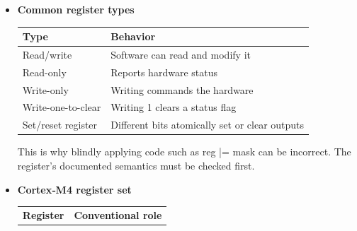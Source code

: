 \documentclass{report}
\begin{document}
\begin{itemize}
\begin{itemize}
                \item \textbf{Peripheral registers}: These are memory-mapped hardware control locations:
                    \begin{itemize}
                        \item GPIOA\_MODER
                        \item GPIOA\_IDR
                        \item GPIOA\_ODR
                        \item RCC\_AHB1ENR
                        \item TIM2\_CR1
                        \item USART2\_DR
                    \end{itemize}
                    They are sometimes called special-function registers, or SFRs.
            \end{itemize}
        \item \textbf{Common register types}
            \begin{center}
                \begin{tabularx}{\textwidth}{@{}XX@{}}
                    \toprule
                    \textbf{Type}&	\textbf{Behavior} \\
                    \midrule
                    Read/write	&Software can read and modify it\\[2ex]
                    Read-only	&Reports hardware status\\[2ex]
                    Write-only	&Writing commands the hardware\\[2ex]
                    Write-one-to-clear	&Writing 1 clears a status flag\\[2ex]
                    Set/reset register	&Different bits atomically set or clear outputs \\
                    \bottomrule
                \end{tabularx}
            \end{center}
            This is why blindly applying code such as reg |= mask can be incorrect. The register’s documented semantics must be checked first.
        \item \textbf{Cortex‑M4 register set}
            \begin{center}
                \begin{tabularx}{\textwidth}{@{}XX@{}}
                    \toprule
                    \textbf{Register}&	\textbf{Conventional role} \\

\end{tabularx}
\end{center}
\end{itemize}
\end{document}
